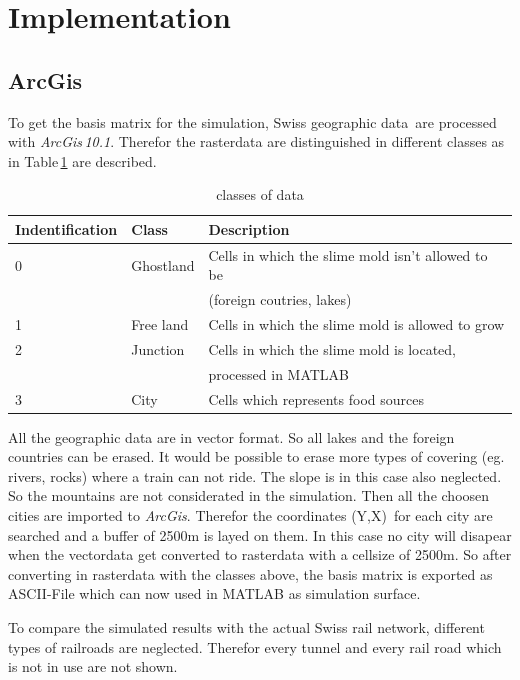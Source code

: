 \documentclass[11pt]{scrartcl}
\begin{document}
\section{Implementation}
\subsection{ArcGis}
\label{sec:arcgis}

To get the basis matrix for the simulation, Swiss geographic data\,\cite{gis_data} are processed with \textit{ArcGis\,10.1}. Therefor the rasterdata are distinguished in different classes as in Table\,\ref{tab:class} are described.

\begin{table}[H]
	\centering
	\caption{classes of data}
		\begin{tabular}{lll}
		\toprule
		Indentification & Class & Description \\
		\midrule
		0 & Ghostland & Cells in which the slime mold isn't allowed to be\\
		& 		& (foreign coutries, lakes)\\
		1 & Free land & Cells in which the slime mold is allowed to grow\\
		2 & Junction & Cells in which the slime mold is located, \\
		& & processed in MATLAB\\
		3 & City & Cells which represents food sources\\
		\bottomrule
	\end{tabular}
\label{tab:class}
\end{table}

All the geographic data are in vector format. So all lakes and the foreign countries can be erased. It would be possible to erase more types of covering (eg. rivers, rocks) where a train can not ride. The slope is in this case also neglected. So the mountains are not considerated in the simulation. Then all the choosen cities are imported to \textit{ArcGis}. Therefor the coordinates (Y,X)\,\cite{coordinates} for each city are searched and a buffer of 2500m is layed on them. In this case no city will disapear when the vectordata get converted to rasterdata with a cellsize of 2500m. So after converting in rasterdata with the classes above, the basis matrix is exported as ASCII-File which can now used in MATLAB as simulation surface.

To compare the simulated results with the actual Swiss rail network, different types of railroads are neglected. Therefor every tunnel and every rail road which is not in use are not shown.
\end{document}
